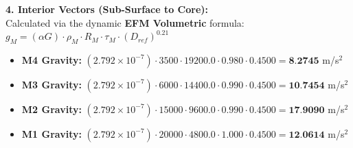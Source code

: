 \documentclass[11pt, a4paper]{article}
\begin{document}
  \vspace{0.5em}
  \noindent \textbf{4. Interior Vectors (Sub-Surface to Core):} \\[0.5em]
  \hspace*{1em} Calculated via the dynamic \textbf{EFM Volumetric} formula: $g_M = (\alpha G) \cdot \rho_{M} \cdot R_M \cdot \tau_M \cdot (D_{ref})^{0.21}$
  \begin{itemize}
    \item \textbf{M4 Gravity:} $(2.792 \times 10^{-7}) \cdot 3500 \cdot 19200.0 \cdot 0.980 \cdot 0.4500 = \textbf{8.2745}$ m/s$^2$
    \item \textbf{M3 Gravity:} $(2.792 \times 10^{-7}) \cdot 6000 \cdot 14400.0 \cdot 0.990 \cdot 0.4500 = \textbf{10.7454}$ m/s$^2$
    \item \textbf{M2 Gravity:} $(2.792 \times 10^{-7}) \cdot 15000 \cdot 9600.0 \cdot 0.990 \cdot 0.4500 = \textbf{17.9090}$ m/s$^2$
    \item \textbf{M1 Gravity:} $(2.792 \times 10^{-7}) \cdot 20000 \cdot 4800.0 \cdot 1.000 \cdot 0.4500 = \textbf{12.0614}$ m/s$^2$
  \end{itemize}
\end{document}
